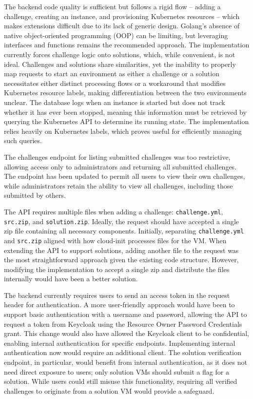 The backend code quality is sufficient but follows a rigid flow -- adding a challenge, creating an instance, and provisioning Kubernetes resources -- which makes extensions difficult due to its lack of generic design. Golang's absence of native object-oriented programming (OOP) can be limiting, but leveraging interfaces and functions remains the recommended approach. The implementation currently forces challenge logic onto solutions, which, while convenient, is not ideal. Challenges and solutions share similarities, yet the inability to properly map requests to start an environment as either a challenge or a solution necessitates either distinct processing flows or a workaround that modifies Kubernetes resource labels, making differentiation between the two environments unclear. The database logs when an instance is started but does not track whether it has ever been stopped, meaning this information must be retrieved by querying the Kubernetes API to determine its running state. The implementation relies heavily on Kubernetes labels, which proves useful for efficiently managing such queries.

The challenges endpoint for listing submitted challenges was too restrictive, allowing access only to administrators and returning all submitted challenges. The endpoint has been updated to permit all users to view their own challenges, while administrators retain the ability to view all challenges, including those submitted by others.

The API requires multiple files when adding a challenge: \texttt{challenge.yml}, \texttt{src.zip}, and \texttt{solution.zip}. Ideally, the request should have accepted a single zip file containing all necessary components. Initially, separating \texttt{challenge.yml} and \texttt{src.zip} aligned with how cloud-init processes files for the VM. When extending the API to support solutions, adding another file to the request was the most straightforward approach given the existing code structure. However, modifying the implementation to accept a single zip and distribute the files internally would have been a better solution.

The backend currently requires users to send an access token in the request header for authentication. A more user-friendly approach would have been to support basic authentication with a username and password, allowing the API to request a token from Keycloak using the Resource Owner Password Credentials grant. This change would also have allowed the Keycloak client to be confidential, enabling internal authentication for specific endpoints. Implementing internal authentication now would require an additional client. The solution verification endpoint, in particular, would benefit from internal authentication, as it does not need direct exposure to users; only solution VMs should submit a flag for a solution. While users could still misuse this 
functionality, requiring all verified challenges to originate from a solution VM would provide a safeguard.

